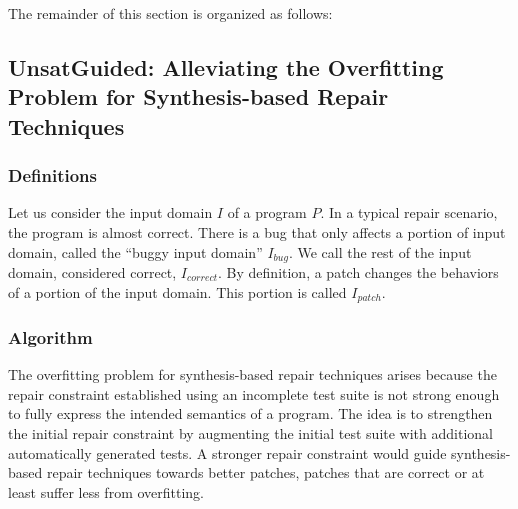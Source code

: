 The remainder of this section is organized as follows:

\subsection{UnsatGuided: Alleviating the Overfitting Problem for Synthesis-based Repair Techniques}
\label{subsec:transversal-contributions:test-for-repair:definitions}

\subsubsection{Definitions}
\label{subsubsec:transversal-contributions:test-for-repair:unsat-guided:definitions}

Let us consider the input domain $I$ of a program $P$.
In a typical repair scenario, the program is almost correct.
There is a bug that only affects a portion of input domain, called the ``buggy input domain'' $I_{bug}$.
We call the rest of the input domain, considered correct, $I_{correct}$. 
By definition, a patch changes the behaviors of a portion of the input domain.
This portion is called $I_{patch}$.


\subsubsection{Algorithm}
\label{subsubsec:transversal-contributions:test-for-repair:unsat-guided:algo}

The overfitting problem for synthesis-based repair techniques arises because the repair constraint established using an incomplete test suite is not strong enough to fully express the intended semantics of a program.
The idea is to strengthen the initial repair constraint by augmenting the initial test suite with additional automatically generated tests. 
A stronger repair constraint would guide synthesis-based repair techniques towards better patches, \ie patches that are correct or at least suffer less from overfitting.

